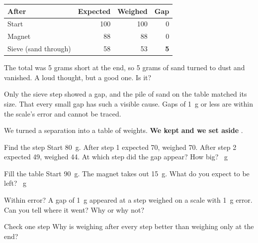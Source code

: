 \begin{center}
\sffamily\small\renewcommand{\arraystretch}{1.5}
\begin{tabular}{@{}lrrr@{}}
\toprule
\textbf{After} & \textbf{Expected} & \textbf{Weighed} & \textbf{Gap}\\
\midrule
Start & 100 & 100 & 0\\
Magnet & 88 & 88 & 0\\
Sieve (sand through) & 58 & 53 & \textbf{5}\\
\bottomrule
\end{tabular}
\end{center}

\begin{multix}[hmm]\multixbot[hmm]\tcblower
The total was 5 grams short at the end, so 5 grams of sand turned to dust and vanished. A loud thought, but a good one. Is it?
\end{multix}

{Only the sieve step showed a gap, and the pile of sand on the table matched its size.}
{That every small gap has such a visible cause. Gaps of 1~g or less are within the scale's error and cannot be traced.}

\begin{keepbox}
We turned a separation into a table of weights. \textbf{We kept} \wline[3.4cm] \textbf{and we set aside} \wline[3.4cm].
\end{keepbox}

\clearpage

\begin{puzzle}{Find the step}
Start 80~g. After step 1 expected 70, weighed 70. After step 2 expected 49, weighed 44. At which step did the gap appear? \wline[2cm] How big? \wline[1.6cm]~g
\end{puzzle}

\begin{puzzle}{Fill the table}
Start 90~g. The magnet takes out 15~g. What do you expect to be left? \wline[1.6cm]~g
\end{puzzle}

\begin{puzzle}{Within error?}
A gap of 1~g appeared at a step weighed on a scale with 1~g error. Can you tell where it went? \wline[2cm] Why or why not? \wline[4cm]
\end{puzzle}

\begin{puzzle}{Check one step}
Why is weighing after every step better than weighing only at the end? \wline[6cm]
\end{puzzle}

